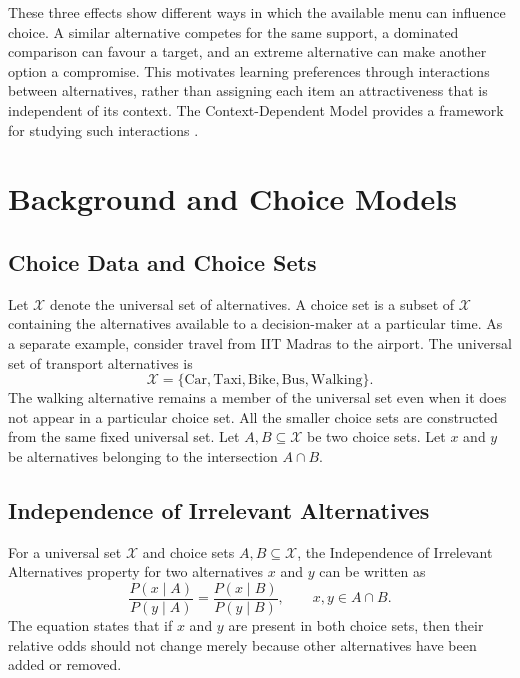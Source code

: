 \documentclass[12pt,oneside]{report}
\newcommand{\X}{\mathcal{X}}
\begin{document}
These three effects show different ways in which the available menu
can influence choice. A similar alternative competes for the same
support, a dominated comparison can favour a target, and an extreme
alternative can make another option a compromise. This motivates
learning preferences through interactions between alternatives,
rather than assigning each item an attractiveness that is independent
of its context. The Context-Dependent Model provides a framework
for studying such interactions \citep{seshadri2019}.

\chapter{Background and Choice Models}
\section{Choice Data and Choice Sets}
Let \(\X\) denote the universal set of alternatives. A choice set is a
subset of \(\X\) containing the alternatives available to a decision-maker
at a particular time.
As a separate example, consider travel from IIT Madras to the
airport. The universal set of transport alternatives is
\begin{equation}
    \X=
    \{
    \text{Car},
    \text{Taxi},
    \text{Bike},
    \text{Bus},
    \text{Walking}
    \}.
\end{equation}
The walking alternative remains a member of the universal set even when it
does not appear in a particular choice set. All the smaller choice sets are
constructed from the same fixed universal set.
Let \(A,B\subseteq\X\) be two choice sets. Let \(x\) and \(y\) be
alternatives belonging to the intersection \(A\cap B\).
\section{Independence of Irrelevant Alternatives}
For a universal set \(\X\) and choice sets \(A,B\subseteq\X\), the
Independence of Irrelevant Alternatives property for two alternatives
\(x\) and \(y\) can be written as
\begin{equation}
    \frac{P(x\mid A)}{P(y\mid A)}
    =
    \frac{P(x\mid B)}{P(y\mid B)},
    \qquad
    x,y\in A\cap B.
    \label{eq:iia}
\end{equation}
The equation states that if \(x\) and \(y\) are present in both choice sets,
then their relative odds should not change merely because other alternatives
have been added or removed.
\end{document}
